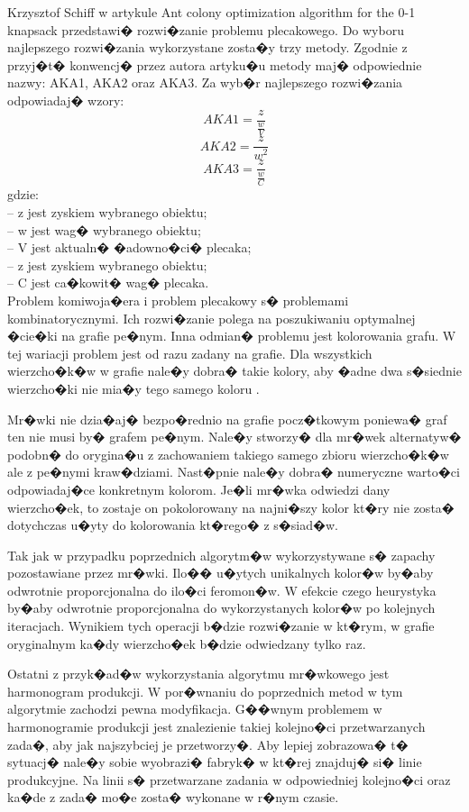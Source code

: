 Krzysztof Schiff w artykule Ant colony optimization algorithm for the 0-1 knapsack\cite{kl_alg_plecakowy} przedstawi� rozwi�zanie problemu plecakowego. Do wyboru najlepszego rozwi�zania wykorzystane zosta�y trzy metody. Zgodnie z przyj�t� konwencj� przez autora artyku�u metody maj� odpowiednie nazwy: AKA1, AKA2 oraz AKA3. Za wyb�r najlepszego rozwi�zania odpowiadaj� wzory: 
	\[
	    AKA1 = \frac{z}{\frac{w}{V}}
	\]
	\[
	    AKA2 = \frac{z}{w^2}
	\]
	\[
	    AKA3 = \frac{z}{\frac{w}{C}}
	\]
gdzie:\\
-- z jest zyskiem wybranego obiektu;\\
-- w jest wag� wybranego obiektu;\\
-- V jest aktualn� �adowno�ci� plecaka;\\
-- z jest zyskiem wybranego obiektu;\\
-- C jest ca�kowit� wag� plecaka.\\

Problem komiwoja�era i problem plecakowy s� problemami kombinatorycznymi. Ich rozwi�zanie polega na poszukiwaniu optymalnej �cie�ki na grafie pe�nym. Inna odmian� problemu jest kolorowania grafu. W tej wariacji problem jest od razu zadany na grafie. Dla wszystkich wierzcho�k�w w grafie nale�y dobra� takie kolory, aby �adne dwa s�siednie wierzcho�ki nie mia�y tego samego koloru \cite{kl_inne_alg_mrowkowe}. 

Mr�wki nie dzia�aj� bezpo�rednio na grafie pocz�tkowym poniewa� graf ten nie musi by� grafem pe�nym. Nale�y stworzy� dla mr�wek alternatyw� podobn� do orygina�u z zachowaniem takiego samego zbioru wierzcho�k�w ale z pe�nymi kraw�dziami. Nast�pnie nale�y dobra� numeryczne warto�ci odpowiadaj�ce konkretnym kolorom. Je�li mr�wka odwiedzi dany wierzcho�ek, to zostaje on pokolorowany na najni�szy kolor kt�ry nie zosta� dotychczas u�yty do kolorowania kt�rego� z s�siad�w.

Tak jak w przypadku poprzednich algorytm�w wykorzystywane s� zapachy pozostawiane przez mr�wki. Ilo�� u�ytych unikalnych kolor�w by�aby odwrotnie proporcjonalna do ilo�ci feromon�w. W efekcie czego heurystyka by�aby odwrotnie proporcjonalna do wykorzystanych kolor�w po kolejnych iteracjach. Wynikiem tych operacji b�dzie rozwi�zanie w kt�rym, w grafie oryginalnym ka�dy wierzcho�ek b�dzie odwiedzany tylko raz.

Ostatni z przyk�ad�w wykorzystania algorytmu mr�wkowego jest harmonogram produkcji. W por�wnaniu do poprzednich metod w tym algorytmie zachodzi pewna modyfikacja. G��wnym problemem w harmonogramie produkcji jest znalezienie takiej kolejno�ci przetwarzanych zada�, aby jak najszybciej je przetworzy�. Aby lepiej zobrazowa� t� sytuacj� nale�y sobie wyobrazi� fabryk� w kt�rej znajduj� si� linie produkcyjne. Na linii s� przetwarzane zadania w odpowiedniej kolejno�ci oraz ka�de z zada� mo�e zosta� wykonane w r�nym czasie\cite{kl_inne_alg_mrowkowe}. 

